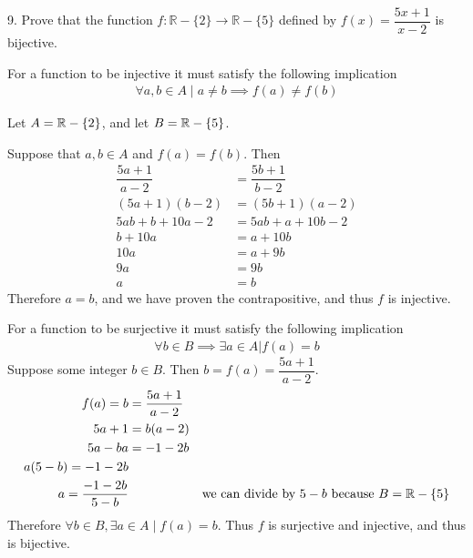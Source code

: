\documentclass{idrisMemo}
\newcommand{\inj}{
\item For a function to be injective it must satisfy the following implication
\begin{align*}
    \forall a,b \in A\mid a\neq b\implies f(a)\neq f(b)
\end{align*}
}
\newcommand{\surj}{
\item For a function to be surjective it must satisfy the following implication
\begin{align*}
    \forall b \in B \implies \exists a \in A | f(a) = b
\end{align*}
}
\begin{document}
\begin{prooflist}{9. Prove that the function $f: \mathbb{R}-\{2\} \rightarrow
    \mathbb{R}-\{5\}$ defined by $f(x)=\dfrac{5 x+1}{x-2}$ is bijective.}
\inj{}
\item Let $A=\mathbb{R}-\{2\}$, and let $B=\mathbb{R}-\{5\}$.
\item Suppose that $a, b\in A$ and $f(a)=f(b)$. Then
    \begin{align*}
        \dfrac{5 a+1}{a-2}&=\dfrac{5 b+1}{b-2}\\
    (5 a+1)(b-2)&=(5 b+1)(a-2)\\
    5ab+b+10a-2&= 5ab+a+10b-2\\
    b+10a&= a+10b\\
    10a&= a+9b\\
    9a&= 9b\\
    a&=b
    \end{align*}
Therefore $a=b$, and we have proven the contrapositive, and thus $f$ is injective.
\surj{}
Suppose some integer $b\in B$. Then $b = f(a) = \dfrac{5a+1}{a-2}$.
    \begin{align*}
        f(a) = b &= \dfrac{5a+1}{a-2}\\
        5a+1 &= b(a-2)\\
        5a-ba &= -1-2b\\
        a(5-b)=-1-2b\\
        a=\dfrac{-1-2b}{5-b}&&\text{we can divide by }5-b\text{ because }
        B=\mathbb{R}-\{5\}\\
    \end{align*}
Therefore $\forall b\in B, \exists a \in A \mid f(a)=b$.  Thus $f$ is surjective
and injective, and thus is bijective.
\end{prooflist}
\end{document}

